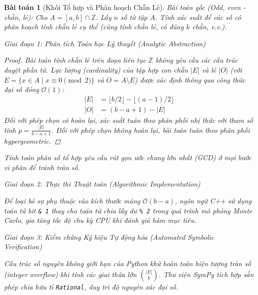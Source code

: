 \documentclass{article}
\newtheorem{baitoan}{Bài toán}
\begin{document}
\begin{baitoan}[Khối Tổ hợp và Phân hoạch Chẵn Lẻ]
 \emph{Bài toán gốc (Odd, even - chẵn, lẻ):} 
 Cho $A = [a,b]\cap\mathbb{Z}$. Lấy $n$ số từ tập $A$. Tính xác suất để các số có phân hoạch tính chẵn lẻ cụ thể (cùng tính chẵn lẻ, có đúng $k$ chẵn, v.v.).

\vspace{0.5em}\noindent\emph{Giai đoạn 1: Phân tích Toán học Lý thuyết (Analytic Abstraction)}
 
 \begin{proof}
 Bài toán tính chẵn lẻ trên đoạn liên tục $\mathbb{Z}$ không yêu cầu các cấu trúc duyệt phần tử. Lực lượng (cardinality) của tập hợp con chẵn $|E|$ và lẻ $|O|$ (với $E = \{x \in A \mid x \equiv 0 \pmod 2\}$ và $O = A \setminus E$) được xác định thông qua công thức đại số đóng $\mathcal{O}(1)$:
 \begin{align}
 |E| &= \lfloor b/2 \rfloor - \lfloor (a-1)/2 \rfloor\\
 |O| &= (b - a + 1) - |E|
 \end{align}
 Đối với phép chọn có hoàn lại, xác suất tuân theo phân phối nhị thức với tham số tĩnh $p = \frac{|E|}{b-a+1}$. Đối với phép chọn không hoàn lại, bài toán tuân theo phân phối hypergeometric.
 \end{proof}
 Tính toán phân số tổ hợp yêu cầu rút gọn ước chung lớn nhất (GCD) ở mọi bước vi phân để tránh tràn số.

\vspace{0.5em}\noindent\emph{Giai đoạn 2: Thực thi Thuật toán (Algorithmic Implementation)}
 
 Để loại bỏ sự phụ thuộc vào kích thước mảng $\mathcal{O}(b-a)$, ngôn ngữ C++ sử dụng toán tử bit \texttt{\& 1} thay cho toán tử chia lấy dư \texttt{\% 2} trong quá trình mô phỏng Monte Carlo, gia tăng tốc độ chu kỳ CPU khi đánh giá hàm mục tiêu.



\vspace{0.5em}\noindent\emph{Giai đoạn 3: Kiểm chứng Ký hiệu Tự động hóa (Automated Symbolic Verification)}
 
 Cấu trúc số nguyên không giới hạn của Python khử hoàn toàn hiện tượng tràn số (integer overflow) khi tính các giai thừa lớn $\binom{|E|}{k}$. Thư viện \textsf{SymPy} tích hợp sẵn phép chia hữu tỉ \texttt{Rational}, duy trì độ nguyên xác đại số.




\end{baitoan}
\end{document}
